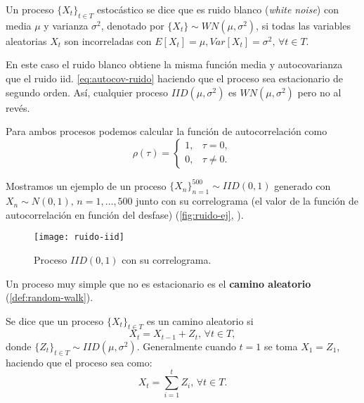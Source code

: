 \begin{definicion}
  Un proceso $\{X_t\}_{t \in T}$ estocástico se dice que es ruido blanco (\emph{white noise}) con media $\mu$ y varianza $\sigma^2$, denotado por $\{X_t\} \sim WN(\mu, \sigma^2)$, si todas las variables aleatorias $X_t$ son incorreladas con $E[X_t] = \mu, Var[X_t] = \sigma^2, \, \forall t \in T$.
\label{def:ruido-blanco}
\end{definicion}

En este caso el ruido blanco obtiene la misma función media y autocovarianza que el ruido iid. \eqref{eq:autocov-ruido} haciendo que el proceso sea estacionario de segundo orden. Así, cualquier proceso $IID(\mu, \sigma^2)$ es $WN(\mu, \sigma^2)$ pero no al revés.

Para ambos procesos podemos calcular la función de autocorrelación como
\begin{equation*}
  \rho(\tau) =
  \begin{cases}
    1, & \tau = 0, \\
    0, & \tau \neq 0.
  \end{cases}
  \label{eq:ruido-autocorrelacion}
\end{equation*}

Mostramos un ejemplo de un proceso $\{X_n\}_{n = 1}^{500} \sim IID(0, 1)$ generado con $X_n \sim N(0, 1), \, n = 1, \ldots, 500$ junto con su correlograma (el valor de la función de autocorrelación en función del desfase) (\autoref{fig:ruido-ej}, \cite{chatfield2019analysis}).

\begin{figure}[htpb]
  \centering
  \texttt{[image: ruido-iid]}
  \caption{Proceso $IID(0, 1)$ con su correlograma.}
  \label{fig:ruido-ej}
\end{figure}

Un proceso muy simple que no es estacionario es el \textbf{camino aleatorio} (\autoref{def:random-walk}).

\begin{definicion}
  Se dice que un proceso $\{X_t\}_{t \in T}$ es un camino aleatorio si
  $$X_t = X_{t - 1} + Z_t, \, \forall t \in T,$$
  donde $\{Z_t\}_{t \in T} \sim IID(\mu , \sigma^2)$. Generalmente cuando $t = 1$ se toma $X_1 = Z_1$, haciendo que el proceso sea como:
  $$X_t = \sum \limits^t_{i = 1} Z_i, \, \forall t \in T.$$
  \label{def:random-walk}
\end{definicion}

